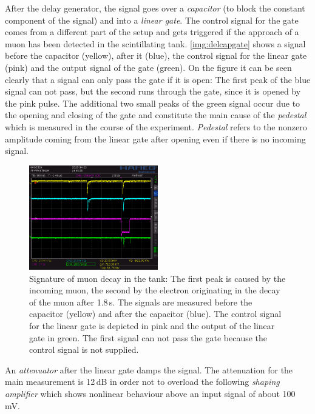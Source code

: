 After the delay generator, the signal goes over a \emph{capacitor} (to block the constant component of the signal)
and into a \emph{linear gate}.
The control signal for the gate comes from a different part of the setup and gets triggered
if the approach of a muon has been detected in the scintillating tank.
\autoref{img:delcapgate} shows a signal before the capacitor (yellow), after it (blue),
the control signal for the linear gate (pink) and the output signal of the gate (green).
On the figure it can be seen clearly that a signal can only pass the gate if it is open:
The first peak of the blue signal can not pass, but the second runs through the gate,
since it is opened by the pink pulse.
The additional two small peaks of the green signal occur due to the opening and closing of the gate
and constitute the main cause of the \emph{pedestal} which is measured in the course of the experiment.
\emph{Pedestal} refers to the nonzero amplitude coming from the linear gate after opening
even if there is no incoming signal.
\begin{figure}[H]
\begin{center}
  \includegraphics[width=0.5\textwidth]{../img/S0014.PNG}
  \caption{Signature of muon decay in the tank: The first peak is caused by the incoming muon,
  the second by the electron originating in the decay of the muon after 1.8\,\textmu s.
  The signals are measured before the capacitor (yellow) and after the capacitor (blue).
  The control signal for the linear gate is depicted in pink and the output of the linear gate in green.
  The first signal can not pass the gate because the control signal is not supplied.}
  \label{img:delcapgate}
\end{center}
\end{figure}
An \emph{attenuator} after the linear gate damps the signal.
The attenuation for the main measurement is 12\,dB in order not to overload the following \emph{shaping amplifier}
which shows nonlinear behaviour above an input signal of about 100\,mV.

